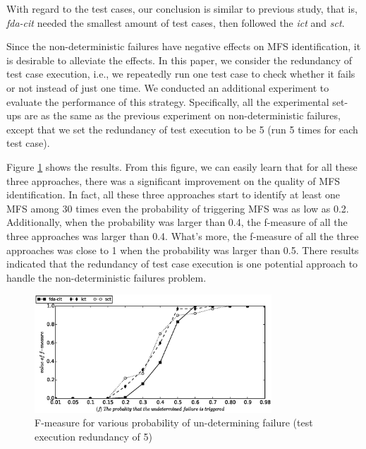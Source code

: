 \documentclass[10pt,journal,compsoc]{IEEEtran}
\begin{document}

With regard to the test cases, our conclusion is similar to previous study, that is, \emph{fda-cit} needed the smallest amount of test cases, then followed the \emph{ict} and \emph{sct}.

{\color{blue}Since the non-deterministic failures have negative effects on MFS identification, it is desirable to alleviate the effects. In this paper, we consider the redundancy of test case execution, i.e., we repeatedly run one test case to check whether it fails or not instead of just one time. We conducted an additional experiment to evaluate the performance of this strategy. Specifically, all the experimental set-ups are as the same as the previous experiment on non-deterministic failures, except that we set the redundancy of test execution to be 5 (run 5 times for each test case).

Figure \ref{sen_und_f_measure_result_reduncy} shows the results. From this figure, we can easily learn that for all these three approaches, there was a significant improvement on the quality of MFS identification. In fact, all these three approaches start to identify at least one MFS among 30 times even the probability of triggering MFS was as low as 0.2. Additionally, when the probability was larger than 0.4, the f-measure of all the three approaches was larger than 0.4. What's more, the f-measure of all the three approaches was close to 1 when  the probability was larger than 0.5.  There results indicated that the redundancy of test case execution is one potential approach to handle the non-deterministic failures problem.
\begin{figure}[htbp]
 \includegraphics[width=3.5in]{sen_und_redundancy.eps}
\caption{F-measure for various probability of un-determining failure (test execution redundancy of 5)}
\label{sen_und_f_measure_result_reduncy}
\end{figure}
}
\end{document}
